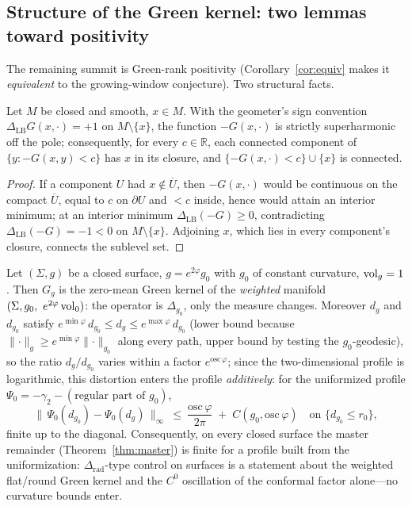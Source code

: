 \subsection{Structure of the Green kernel: two lemmas toward positivity}\label{ssec:structure}

The remaining summit is Green-rank positivity (Corollary~\ref{cor:equiv} makes
it \emph{equivalent} to the growing-window conjecture).  Two structural facts.

\begin{lemma}\label{lem:sublevel}
Let $M$ be closed and smooth, $x\in M$.  With the geometer's sign convention
$\Delta_{\mathrm{LB}}G(x,\cdot)=+1$ on $M\setminus\{x\}$, the function
$-G(x,\cdot)$ is strictly superharmonic off the pole; consequently, for every
$c\in\mathbb R$, each connected component of $\{y:-G(x,y)<c\}$ has $x$ in its
closure, and $\{-G(x,\cdot)<c\}\cup\{x\}$ is connected.
\end{lemma}

\begin{proof}
If a component $U$ had $x\notin\overline U$, then $-G(x,\cdot)$ would be
continuous on the compact $\overline U$, equal to $c$ on $\partial U$ and $<c$
inside, hence would attain an interior minimum; at an interior minimum
$\Delta_{\mathrm{LB}}(-G)\ge0$, contradicting
$\Delta_{\mathrm{LB}}(-G)=-1<0$ on $M\setminus\{x\}$.  Adjoining $x$, which lies
in every component's closure, connects the sublevel set.
\end{proof}

\begin{lemma}\label{lem:conformal}
Let $(\Sigma,g)$ be a closed surface, $g=e^{2\varphi}g_0$ with $g_0$ of constant
curvature, $\operatorname{vol}_g=1$.  Then $G_g$ is the zero-mean Green kernel of the
\emph{weighted} manifold $(\Sigma,g_0,\ e^{2\varphi}\operatorname{vol}_0)$: the operator is
$\Delta_{g_0}$, only the measure changes.  Moreover $d_g$ and $d_{g_0}$ satisfy
$e^{\min\varphi}\,d_{g_0}\le d_g\le e^{\max\varphi}\,d_{g_0}$ (lower bound because
$\lVert\cdot\rVert_g\ge e^{\min\varphi}\lVert\cdot\rVert_{g_0}$ along every path,
upper bound by testing the $g_0$-geodesic), so the ratio $d_g/d_{g_0}$ varies
within a factor $e^{\mathrm{osc}\,\varphi}$; since the two-dimensional profile is
logarithmic, this distortion enters the profile \emph{additively}: for the uniformized
profile $\Psi_0=-\gamma_2-(\text{regular part of }g_0)$,
\[
\bigl\lVert\,\Psi_0(d_{g_0})-\Psi_0(d_g)\,\bigr\rVert_\infty\ \le\
\frac{\mathrm{osc}\,\varphi}{2\pi}\;+\;C(g_0,\mathrm{osc}\,\varphi)
\quad\text{on }\{d_{g_0}\le r_0\},
\]
finite up to the diagonal.  Consequently, on every closed surface the master
remainder (Theorem~\ref{thm:master}) is finite for a profile built from the uniformization:
$\Delta_{\mathrm{rad}}$-type control on surfaces is a statement about the
weighted flat/round Green kernel and the $C^0$ oscillation of the conformal
factor alone---no curvature bounds enter.
\end{lemma}


